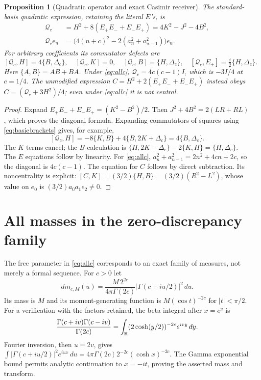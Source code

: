 \documentclass[11pt]{article}
\newtheorem{proposition}[theorem]{Proposition}
\newcommand{\ac}[2]{\{#1,#2\}}
\begin{document}
\begin{proposition}[Quadratic operator and exact Casimir receiver]
\label{prop:casimir}
The standard-basis quadratic expression, retaining the
literal $E$'s, is
\begin{equation}\label{eq:Cas}
 \begin{split}
 \mathcal Q_c
 &=H^2+8(E_+E_-+E_-E_+)
   =4K^2-J^2-4B^2,\\
 \mathcal Q_ce_n
 &=\bigl(4(n+c)^2-2(a_n^2+a_{n-1}^2)\bigr)e_n.
 \end{split}
\end{equation}
For arbitrary coefficients its commutator defects are
\begin{equation}\label{eq:Casdef}
 [\mathcal Q_c,H]=4\ac B{\Delta_c},\quad
 [\mathcal Q_c,K]=0,\quad
 [\mathcal Q_c,B]=\ac H{\Delta_c},\quad
 [\mathcal Q_c,E_\pm]=\tfrac i2\ac H{\Delta_c}.
\end{equation}
Here $\ac AB=AB+BA$. Under \eqref{eq:allc},
$\mathcal Q_c=4c(c-1)I$, which is $-3I/4$ at $c=1/4$.
The unmodified expression
$C=H^2+2(E_+E_-+E_-E_+)$ instead obeys
$C=(\mathcal Q_c+3H^2)/4$; even under
\eqref{eq:allc} it is not central.
\end{proposition}
\begin{proof}
Expand $E_+E_-+E_-E_+=(K^2-B^2)/2$.
Then $J^2+4B^2=2(LR+RL)$, which proves the diagonal
formula. Expanding commutators of squares using
\eqref{eq:basicbrackets} gives, for example,
\[
 [\mathcal Q_c,H]
  =-8\ac KB+4\ac B{2K+\Delta_c}
  =4\ac B{\Delta_c}.
\]
The $K$ terms cancel; the $B$ calculation is
$\ac H{2K+\Delta_c}-2\ac KH=\ac H{\Delta_c}$.
The $E$ equations follow by linearity.
For \eqref{eq:allc},
$a_n^2+a_{n-1}^2=2n^2+4cn+2c$,
so the diagonal is $4c(c-1)$.
The equation for $C$ follows by direct subtraction.
Its noncentrality is explicit:
$[C,K]=(3/2)\ac HB=(3/2)(R^2-L^2)$,
whose value on $e_0$ is $(3/2)a_0a_1e_2\ne0$.
\end{proof}

\section{All masses in the zero-discrepancy family}

The free parameter in \eqref{eq:allc} corresponds to an exact
family of measures, not merely a formal sequence. For $c>0$ let
\begin{equation}\label{eq:gamfamily}
 dm_{c,M}(u)=
 \frac{M\,2^{2c}}{4\pi\Gamma(2c)}
       |\Gamma(c+iu/2)|^2\,du .
\end{equation}
Its mass is $M$ and its moment-generating function is
$M(\cos t)^{-2c}$ for $|t|<\pi/2$.
For a verification with the factors retained, the beta integral
after $x=e^y$ is
\[
 \frac{\Gamma(c+iv)\Gamma(c-iv)}{\Gamma(2c)}
  =\int_\mathbb R (2\cosh(y/2))^{-2c}e^{ivy}\,dy .
\]
Fourier inversion, then $u=2v$, gives
$\int|\Gamma(c+iu/2)|^2e^{iux}\,du
 =4\pi\Gamma(2c)2^{-2c}(\cosh x)^{-2c}$.
The Gamma exponential bound permits analytic continuation
to $x=-it$, proving the asserted mass and transform.
\end{document}
